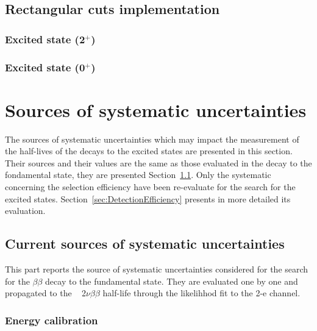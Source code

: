 \documentclass[main.tex]{subfiles}
\begin{document}
\FloatBarrier

\subsection{Rectangular cuts implementation}\label{sec:RCoptimisation}

\subsubsection{Excited state (2$^+$)}

\subsubsection{Excited state (0$^+$)}


\FloatBarrier


\section{Sources of systematic uncertainties}\label{sec:SourceOfSystematics}


\NI The sources of systematic uncertainties which may impact the measurement of the half-lives of the decays to the excited states are presented in this section. Their sources and their values are the same as those evaluated in the decay to the fondamental state, they are presented Section~\ref{sec:CurrentSystematics}. Only the systematic concerning the selection efficiency have been re-evaluate for the search for the excited states. Section~\ref{sec:DetectionEfficiency} presents in more detailed its evaluation. 



\subsection{Current sources of systematic uncertainties} \label{sec:CurrentSystematics}


\NI This part reports the source of systematic uncertainties considered for the search for the $\beta\beta$ decay to the fundamental state. They are evaluated one by one and propagated to the \Cd~ 2$\nu\beta\beta$ half-life through the likelihhod fit to the 2-e channel.


\subsubsection{Energy calibration}
\end{document}

